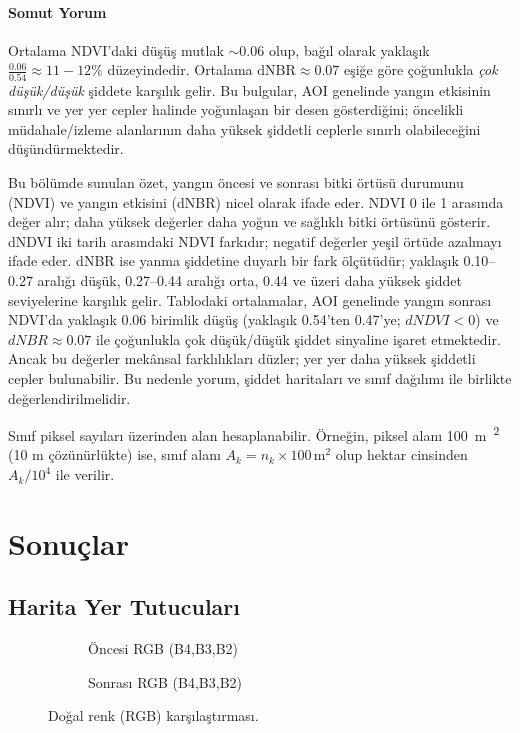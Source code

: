 \documentclass[11pt,a4paper]{article}
\begin{document}
\paragraph{Somut Yorum} Ortalama NDVI’daki düşüş mutlak \(\sim0.06\) olup, bağıl olarak yaklaşık \(\frac{0.06}{0.54} \approx 11{-}12\%\) düzeyindedir. Ortalama \(\mathrm{dNBR} \approx 0.07\) eşiğe göre çoğunlukla \emph{çok düşük/düşük} şiddete karşılık gelir. Bu bulgular, AOI genelinde yangın etkisinin sınırlı ve yer yer cepler halinde yoğunlaşan bir desen gösterdiğini; öncelikli müdahale/izleme alanlarının daha yüksek şiddetli ceplerle sınırlı olabileceğini düşündürmektedir.

Bu bölümde sunulan özet, yangın öncesi ve sonrası bitki örtüsü durumunu (NDVI) ve yangın etkisini (dNBR) nicel olarak ifade eder. NDVI 0 ile 1 arasında değer alır; daha yüksek değerler daha yoğun ve sağlıklı bitki örtüsünü gösterir. dNDVI iki tarih arasındaki NDVI farkıdır; negatif değerler yeşil örtüde azalmayı ifade eder. dNBR ise yanma şiddetine duyarlı bir fark ölçütüdür; yaklaşık 0.10--0.27 aralığı düşük, 0.27--0.44 aralığı orta, 0.44 ve üzeri daha yüksek şiddet seviyelerine karşılık gelir. Tablodaki ortalamalar, AOI genelinde yangın sonrası NDVI’da yaklaşık 0.06 birimlik düşüş (yaklaşık 0.54'ten 0.47'ye; \(dNDVI<0\)) ve \(dNBR \approx 0.07\) ile çoğunlukla çok düşük/düşük şiddet sinyaline işaret etmektedir. Ancak bu değerler mekânsal farklılıkları düzler; yer yer daha yüksek şiddetli cepler bulunabilir. Bu nedenle yorum, şiddet haritaları ve sınıf dağılımı ile birlikte değerlendirilmelidir.

Sınıf piksel sayıları üzerinden alan hesaplanabilir. Örneğin, piksel alanı \SI{100}{m\textsuperscript{2}}
(10 m çözünürlükte) ise, sınıf alanı $A_k = n_k \times 100\,\mathrm{m^2}$ olup
hektar cinsinden $A_k/10^4$ ile verilir.

\section{Sonuçlar}
\subsection*{Harita Yer Tutucuları}
\begin{figure}[h]
  \centering
  \begin{subfigure}[b]{0.48\textwidth}
    \centering
    \caption{Öncesi RGB (B4,B3,B2)}
  \end{subfigure}\hfill
  \begin{subfigure}[b]{0.48\textwidth}
    \centering
    \caption{Sonrası RGB (B4,B3,B2)}
  \end{subfigure}
  \caption{Doğal renk (RGB) karşılaştırması.}
\end{figure}
\end{document}
